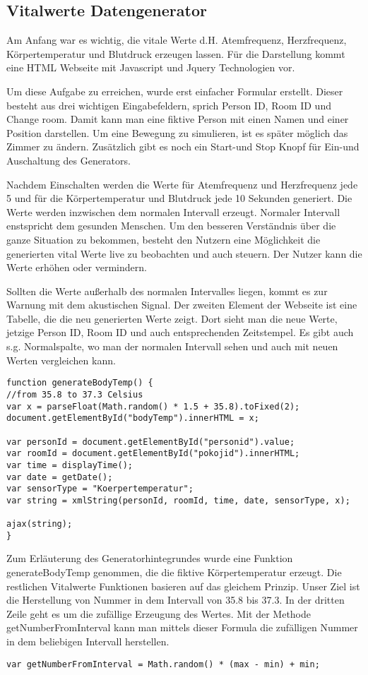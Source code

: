 \subsection{Vitalwerte Datengenerator}
Am Anfang war es wichtig, die vitale Werte d.H. Atemfrequenz, Herzfrequenz, Körpertemperatur und Blutdruck erzeugen lassen. Für die Darstellung kommt eine HTML Webseite mit Javascript und Jquery Technologien vor.

Um diese Aufgabe zu erreichen, wurde erst einfacher Formular erstellt.
Dieser besteht aus drei wichtigen Eingabefeldern, sprich Person ID, Room ID und Change room. Damit kann man eine fiktive Person mit einen Namen und einer Position darstellen. Um eine Bewegung zu simulieren, ist es später möglich das Zimmer zu ändern. Zusätzlich gibt es noch ein Start-und Stop Knopf für Ein-und Auschaltung des Generators.
 
Nachdem Einschalten werden die Werte für Atemfrequenz und Herzfrequenz jede 5 und für die Körpertemperatur und Blutdruck jede 10 Sekunden generiert. Die Werte werden inzwischen dem normalen Intervall erzeugt. Normaler Intervall enstspricht dem gesunden Menschen. Um den besseren Verständnis über die ganze Situation zu bekommen, besteht den Nutzern eine Möglichkeit die generierten vital Werte live zu beobachten und auch steuern. Der Nutzer kann die Werte erhöhen oder vermindern.

Sollten die Werte außerhalb des normalen Intervalles liegen, kommt es zur Warnung mit dem akustischen Signal. 
Der zweiten Element der Webseite ist eine Tabelle, die die neu generierten Werte zeigt. Dort sieht man die neue Werte, jetzige Person ID, Room ID und auch entsprechenden Zeitstempel. Es gibt auch s.g. Normalspalte, wo man der normalen Intervall sehen und auch mit neuen Werten vergleichen kann.
\\
\begin{lstlisting}
function generateBodyTemp() {
//from 35.8 to 37.3 Celsius
var x = parseFloat(Math.random() * 1.5 + 35.8).toFixed(2);
document.getElementById("bodyTemp").innerHTML = x;

var personId = document.getElementById("personid").value;
var roomId = document.getElementById("pokojid").innerHTML;
var time = displayTime();
var date = getDate();
var sensorType = "Koerpertemperatur"; 
var string = xmlString(personId, roomId, time, date, sensorType, x);

ajax(string);    
}
\end{lstlisting}

Zum Erläuterung des Generatorhintegrundes wurde eine Funktion generateBodyTemp genommen, die die fiktive Körpertemperatur erzeugt. Die restlichen Vitalwerte Funktionen basieren auf das gleichem Prinzip. Unser Ziel ist die Herstellung von Nummer in dem Intervall von 35.8 bis 37.3. In der dritten Zeile geht es um die zufällige Erzeugung des Wertes. Mit der Methode getNumberFromInterval kann man mittels dieser Formula die zufälligen Nummer in dem beliebigen Intervall herstellen. 
\begin{lstlisting}
var getNumberFromInterval = Math.random() * (max - min) + min;
\end{lstlisting}

